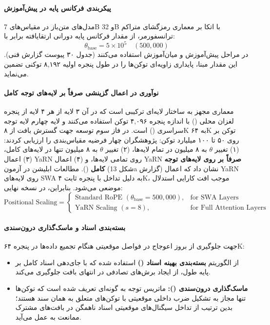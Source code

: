 \item {}

\paragraph*{پیکربندی فرکانس پایه در پیش‌آموزش}
مدل‌های متن‌باز  \cite{olmo2025olmo3} در مقیاس‌های 7B و 32B با اتکا بر معماری رمزگشای متراکم ترانسفورمر، از مقدار فرکانس پایه دورانی ارتقایافته برابر با:
\begin{equation}
    \theta_{\text{base}} = 5 \times 10^5 \quad (500,000)
\end{equation}
در مراحل پیش‌آموزش و میان‌آموزش استفاده می‌کنند (جدول ۳۰ پیوست گزارش فنی). این مقدار مبنا، پایداری زاویه‌ای توکن‌ها را در طول پنجره اولیه ۸,۱۹۲ توکنی تضمین می‌نماید.

\paragraph*{نوآوری در اعمال گزینشی  صرفاً بر لایه‌های توجه کامل}
معماری  مجهز به ساختار لایه‌ای ترکیبی است که در آن ۳ لایه از هر ۴ لایه از پنجره لغزان محلی () با اندازه پنجره ۴,۰۹۶ توکن استفاده می‌کنند و لایه چهارم لایه توجه سراسری () است. در فاز سوم توسعه جهت گسترش بافت از ۸K به ۶۴K توکن بر روی ۵۰ تا ۱۰۰ میلیارد توکن:
پژوهشگران چهار فرضیه مقیاس‌بندی را ارزیابی کردند: (۱) تغییر $\theta$ به ۸ میلیون در تمام لایه‌ها، (۲) تغییر $\theta$ به ۸ میلیون تنها در لایه‌های کامل، (۳) اعمال YaRN روی تمامی لایه‌ها، و (۴) اعمال YaRN \textbf{صرفاً بر روی لایه‌های توجه کامل} ().
مطالعات ابلیشن در آزمون  (شکل 13a گزارش) نشان داد که اعمال YaRN روی لایه‌های SWA به دلیل تداخل با پنجره ثابت ۴K، موجب افت کارایی استدلال موضعی می‌شود. بنابراین، در نسخه نهایی:
\begin{equation}
    \text{Positional Scaling} = \begin{cases} 
    \text{Standard RoPE } (\theta_{\text{base}} = 500,000), & \text{for SWA Layers} \\
    \text{YaRN Scaling } (s = 8), & \text{for Full Attention Layers}
    \end{cases}
\end{equation}

\paragraph*{بسته‌بندی اسناد و ماسک‌گذاری درون‌سندی}
جهت جلوگیری از بروز اعوجاج در فواصل موقعیتی هنگام تجمیع داده‌ها در پنجره ۶۴K:
\begin{itemize}
    \item از الگوریتم \textbf{بسته‌بندی بهینه اسناد ()} \cite{ding2024fewer} استفاده شده که با جای‌دهی اسناد کامل بر پایه طول، از ایجاد برش‌های تصادفی در انتهای بافت جلوگیری می‌کند.
    \item \textbf{ماسک‌گذاری درون‌سندی ():} ماتریس توجه به گونه‌ای تعریف شده است که توکن‌ها تنها مجاز به تشکیل ضرب داخلی موقعیتی با توکن‌های متعلق به همان سند هستند؛ بدین ترتیب از تداخل سیگنال‌های موقعیتی اسناد ناهمگن در بافت‌های مشترک ممانعت به عمل می‌آید.
\end{itemize}

